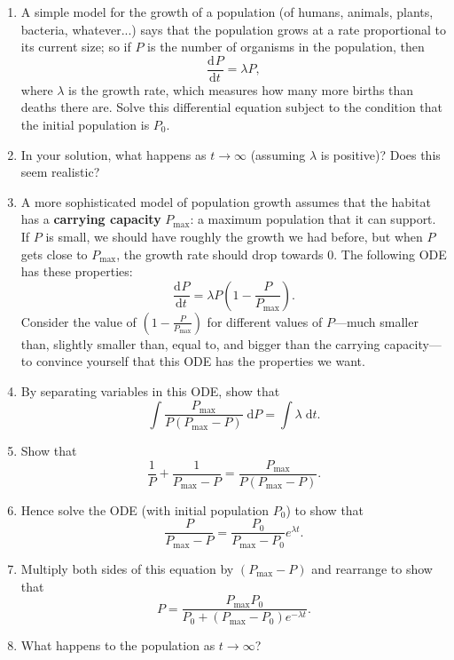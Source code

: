 \documentclass{article}
\newcommand{\deriv}[3][]{\frac{\mathrm{d}^{#1}#2}{\mathrm{d}#3^{#1}}}
\newcommand{\diff}{\;\mathrm{d}}
\begin{document}
\begin{enumerate}
	\item A simple model for the growth of a population (of humans, animals, plants, bacteria, whatever...) says that the population grows at a rate proportional to its current size; so if $P$ is the number of organisms in the population, then
		\[\deriv{P}{t}=\lambda P,\]
		where $\lambda$ is the growth rate, which measures how many more births than deaths there are. Solve this differential equation subject to the condition that the initial population is $P_0$.
	\item In your solution, what happens as $t\to\infty$ (assuming $\lambda$ is positive)? Does this seem realistic?
	\item A more sophisticated model of population growth assumes that the habitat has a \textbf{carrying capacity} $P_\mathrm{max}$: a maximum population that it can support. If $P$ is small, we should have roughly the growth we had before, but when $P$ gets close to $P_\mathrm{max}$, the growth rate should drop towards 0. The following ODE has these properties:
		\[\deriv{P}{t}=\lambda P\left(1-\frac{P}{P_\mathrm{max}}\right).\]
		Consider the value of $\left(1-\frac{P}{P_\mathrm{max}}\right)$ for different values of $P$---much smaller than, slightly smaller than, equal to, and bigger than the carrying capacity---to convince yourself that this ODE has the properties we want.
	\item By separating variables in this ODE, show that
		\[\int \frac{P_\mathrm{max}}{P(P_\mathrm{max}-P)}\diff P = \int \lambda \diff t.\]
	\item Show that
		\[\frac{1}{P}+\frac{1}{P_\mathrm{max}-P}=\frac{P_\mathrm{max}}{P(P_\mathrm{max}-P)}.\]
	\item Hence solve the ODE (with initial population $P_0$) to show that
		\[\frac{P}{P_\mathrm{max}-P}=\frac{P_0}{P_\mathrm{max}-P_0} e^{\lambda t}.\]
	\item Multiply both sides of this equation by $(P_\mathrm{max}-P)$ and rearrange to show that
		\[P=\frac{P_\mathrm{max} P_0 }{P_0  +(P_\mathrm{max}-P_0)e^{-\lambda t}}.\]
	\item What happens to the population as $t\to \infty$?
\end{enumerate}
\end{document}
